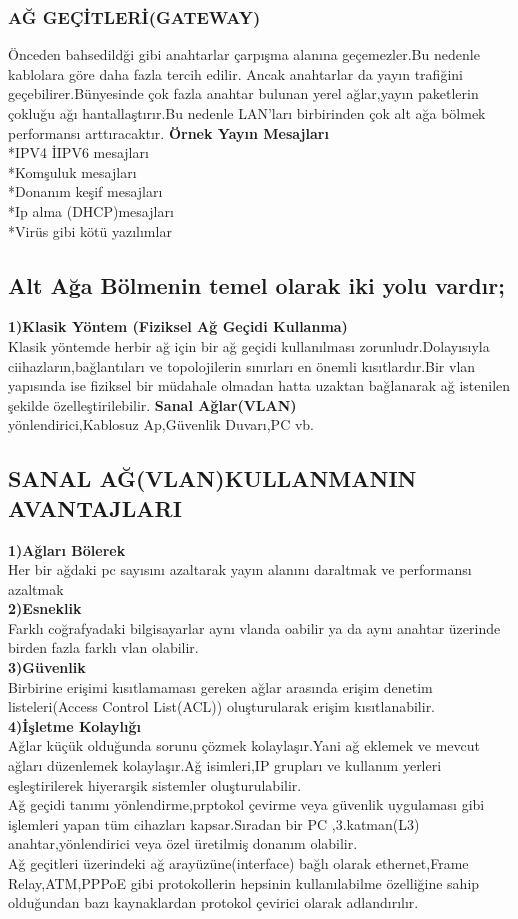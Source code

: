 \subsubsection*{AĞ GEÇİTLERİ(GATEWAY)}
Önceden bahsedildği gibi anahtarlar çarpışma alanına geçemezler.Bu nedenle kablolara göre daha fazla tercih edilir.
Ancak anahtarlar da yayın trafiğini geçebilirer.Bünyesinde çok fazla anahtar bulunan yerel ağlar,yayın paketlerin çokluğu ağı hantallaştırır.Bu nedenle LAN'ları birbirinden çok alt ağa bölmek performansı arttıracaktır.
\textbf{Örnek Yayın Mesajları}\\
*IPV4 İIPV6 mesajları\\
*Komşuluk mesajları\\
*Donanım keşif mesajları\\
*Ip alma (DHCP)mesajları\\
*Virüs gibi kötü yazılımlar\\
\subsection*{Alt Ağa Bölmenin temel olarak iki yolu vardır;}
\textbf{1)Klasik  Yöntem (Fiziksel Ağ Geçidi Kullanma)}\\
Klasik yöntemde herbir ağ için bir ağ geçidi kullanılması zorunludr.Dolayısıyla ciihazların,bağlantıları ve topolojilerin sınırları en önemli kısıtlardır.Bir vlan yapısında ise fiziksel bir müdahale olmadan hatta uzaktan bağlanarak ağ istenilen şekilde özelleştirilebilir.
\textbf{Sanal Ağlar(VLAN)}\\
yönlendirici,Kablosuz Ap,Güvenlik Duvarı,PC vb.
\subsection*{SANAL AĞ(VLAN)KULLANMANIN AVANTAJLARI}
\textbf{1)Ağları Bölerek}\\
Her bir ağdaki pc sayısını azaltarak yayın alanını daraltmak ve performansı azaltmak\\
\textbf{2)Esneklik}\\
 Farklı coğrafyadaki bilgisayarlar aynı vlanda oabilir ya da aynı anahtar üzerinde birden fazla farklı vlan olabilir.\\
\textbf{3)Güvenlik}\\ Birbirine erişimi kısıtlamaması gereken ağlar arasında erişim denetim listeleri(Access Control List(ACL)) oluşturularak erişim kısıtlanabilir.\\
\textbf{4)İşletme Kolaylığı}\\
Ağlar küçük olduğunda sorunu çözmek kolaylaşır.Yani ağ eklemek ve mevcut ağları düzenlemek kolaylaşır.Ağ  isimleri,IP grupları ve kullanım yerleri eşleştirilerek hiyerarşik  sistemler oluşturulabilir.\\
Ağ geçidi tanımı yönlendirme,prptokol çevirme veya  güvenlik uygulaması gibi işlemleri yapan tüm cihazları kapsar.Sıradan bir PC ,3.katman(L3) anahtar,yönlendirici veya özel üretilmiş  donanım olabilir.\\
  Ağ geçitleri üzerindeki  ağ arayüzüne(interface) bağlı olarak ethernet,Frame Relay,ATM,PPPoE gibi protokollerin hepsinin kullanılabilme özelliğine sahip olduğundan bazı kaynaklardan protokol çevirici olarak adlandırılır.
